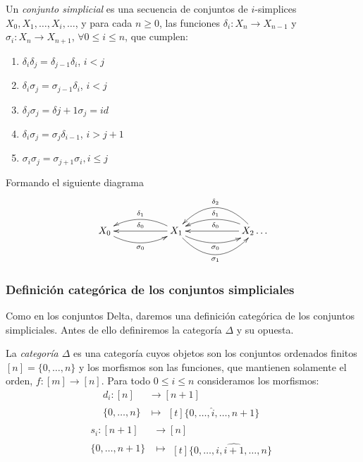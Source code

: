 \documentclass[../main.tex]{subfiles}
\begin{document}
\newpage
\begin{defi}
    Un \emph{conjunto simplicial} es una secuencia de conjuntos de $i$-simplices $X_0,X_1,\dots,X_i,\dots$, y para cada $n\ge 0$, las funciones $\delta_i: X_n \to X_{n-1}$ y $\sigma_i: X_n \to X_{n+1}$, $\forall 0\le i \le n$, que cumplen:

    \begin{enumerate}[(1)]
        \item $\delta_i\delta_j = \delta_{j-1}\delta_{i}$, $i<j$
        \item $\delta_i\sigma_j = \sigma_{j-1}\delta_{i}$, $i<j$
        \item $\delta_j\sigma_j = \delta{j+1}\sigma_{j} = id$
        \item $\delta_i\sigma_j = \sigma_{j}\delta_{i-1}$, $i>j+1$
        \item $\sigma_i\sigma_j = \sigma_{j+1}\sigma_{i}, i\le j$
    \end{enumerate}
    Formando el siguiente diagrama
    $$
        \xymatrix{
        X_0 \ar@/{}_{1pc}/[rr]_{\sigma_0} & & X_1 \ar@/{}_{1pc}/[rr]_{\sigma_0} \ar@/{}_{2pc}/[rr]_{\sigma_1} \ar@/{}_{1pc}/[ll]_{\delta_1} \ar[ll]_{\delta_0} & & X_2 \ar@/{}_{2pc}/[ll]_{\delta_2} \ar@/{}_{1pc}/[ll]_{\delta_1} \ar[ll]_{\delta_0} \dots
        }
    $$
\end{defi}

\subsubsection{Definici\'on categ\'orica de los conjuntos simpliciales}
Como en los conjuntos Delta, daremos una definici\'on categ\'orica de los conjuntos simpliciales. Antes de ello definiremos la categor\'ia $\Delta$ y su opuesta.
\begin{defi}
    La \emph{categor\'ia $\Delta$} es una categor\'ia cuyos objetos son los conjuntos ordenados finitos $[n] = \{0,\dots,n\}$ y los morfismos son las funciones, que mantienen solamente el orden, $f\colon [m] \to [n]$.
    Para todo $0\le i \le n$ consideramos los morfismos:
    \begin{align*}
        d_i: [n]      & \longrightarrow [n+1] \\
        \{0,\dots,n\} & \longmapsto\!
        \begin{aligned}[t]
            \{0,\dots, \hat{i}, \dots,n+1\}
        \end{aligned}
    \end{align*}
    \begin{align*}
        s_i: [n+1]      & \longrightarrow [n] \\
        \{0,\dots,n+1\} & \longmapsto\!
        \begin{aligned}[t]
            \{0,\dots,i,\widehat{i+1}, \dots,n\}
        \end{aligned}
    \end{align*}
\end{defi}
\end{document}

